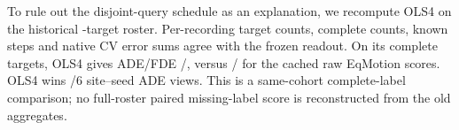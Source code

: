To rule out the disjoint-query schedule as an explanation, we
recompute OLS4 on the historical \DutMotionFullTargets{}-target
roster. Per-recording target counts, complete counts, known steps
and native CV error sums agree with the frozen readout. On its
\DutMotionFullComplete{} complete targets, OLS4 gives ADE/FDE
\DutMotionFullOLSADE{}/\DutMotionFullOLSFDE{}, versus
\DutMotionFullEqADE{}/\DutMotionFullEqFDE{} for the cached raw EqMotion
scores. OLS4 wins \DutMotionFullWins{}/6 site--seed ADE views.
This is a same-cohort complete-label comparison; no full-roster
paired missing-label score is reconstructed from the old aggregates.
